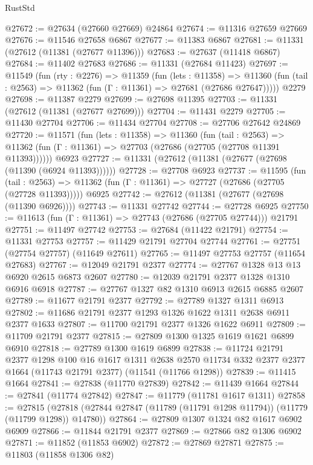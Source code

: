 \begin{lexlean}{RustStd}
\begin{coremodule}
@27672 := @27634 (@27660 @27669) @24864
@27674 := @11316 @27659 @27669
@27676 := @11546 @27658 @6867
@27677 := @11383 @6867
@27681 := @11331 (@27612 (@11381 (@27677 @11396)))
@27683 := @27637 (@11418 @6867)
@27684 := @11402 @27683
@27686 := @11331 (@27684 @11423)
@27697 := @11549
    (fun (rty : @2276) =>
    @11359
      (fun (lets : @11358) =>
      @11360 (fun (tail : @2563) => @11362 (fun (Γ : @11361) => @27681 (@27686 @27647)))))
    @2279
@27698 := @11387 @2279
@27699 := @27698 @11395
@27703 := @11331 (@27612 (@11381 (@27677 @27699)))
@27704 := @11431 @2279
@27705 := @11430 @27704
@27706 := @11434 @27704
@27708 := @27706 @27642 @24869
@27720 := @11571
    (fun (lets : @11358) =>
    @11360
      (fun (tail : @2563) =>
      @11362 (fun (Γ : @11361) => @27703 (@27686 (@27705 (@27708 @11391 @11393))))))
    @6923
@27727 := @11331 (@27612 (@11381 (@27677 (@27698 (@11390 (@6924 @11393))))))
@27728 := @27708 @6923
@27737 := @11595
    (fun (tail : @2563) => @11362 (fun (Γ : @11361) => @27727 (@27686 (@27705 (@27728 @11393)))))
    @6925
@27742 := @27612 (@11381 (@27677 (@27698 (@11390 @6926))))
@27743 := @11331 @27742
@27744 := @27728 @6925
@27750 := @11613 (fun (Γ : @11361) => @27743 (@27686 (@27705 @27744))) @21791
@27751 := @11497 @27742
@27753 := @27684 (@11422 @21791)
@27754 := @11331 @27753
@27757 := @11429 @21791 @27704 @27744
@27761 := @27751 (@27754 @27757) (@11649 @27611)
@27765 := @11497 @27753 @27757 (@11654 @27683)
@27767 := @12049 @21791 @2377
@27774 := @27767 @1328 @13 @13 @6920 @2615 @6873 @2607
@27780 := @12039 @21791 @2377 @1328 @1310 @6916 @6918
@27787 := @27767 @1327 @82 @1310 @6913 @2615 @6885 @2607
@27789 := @11677 @21791 @2377
@27792 := @27789 @1327 @1311 @6913
@27802 := @11686 @21791 @2377 @1293 @1326 @1622 @1311 @2638 @6911 @2377 @1633
@27807 := @11700 @21791 @2377 @1326 @1622 @6911
@27809 := @11709 @21791 @2377
@27815 := @27809 @1300 @1325 @1619 @1621 @6899 @6910
@27818 := @27789 @1300 @1619 @6899
@27838 := @11724
    @21791
    @2377
    @1298
    @100
    @16
    @1617
    @1311
    @2638
    @2570
    @11734
    @332
    @2377
    @2377
    @1664
    (@11743 @21791 @2377)
    (@11541 (@11766 @1298))
@27839 := @11415 @1664
@27841 := @27838 (@11770 @27839)
@27842 := @11439 @1664
@27844 := @27841 (@11774 @27842)
@27847 := @11779 (@11781 @1617 @1311)
@27858 := @27815
    (@27818 (@27844 @27847 (@11789 (@11791 @1298 @11794)) (@11779 (@11799 @1298)) @14780))
@27864 := @27809 @1307 @1324 @82 @1617 @6902 @6909
@27866 := @11844 @21791 @2377
@27869 := @27866 @82 @1306 @6902
@27871 := @11852 (@11853 @6902)
@27872 := @27869 @27871
@27875 := @11803 (@11858 @1306 @82)

\end{coremodule}
\end{lexlean}
